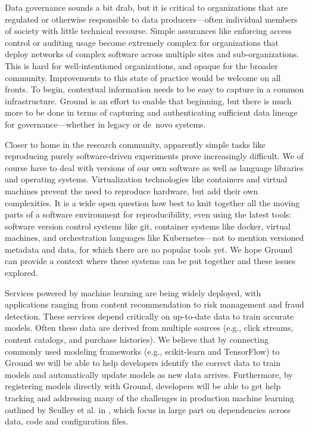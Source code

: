 \documentclass{cidr-2017}
\begin{document}
Data governance sounds a bit drab, but it is critical to organizations that are regulated or otherwise responsible to data producers---often individual members of society with little technical recourse. Simple assurances like enforcing access control or auditing usage become extremely complex for organizations that deploy networks of complex software across multiple sites and sub-organizations. This is hard for well-intentioned organizations, and opaque for the broader community. Improvements to this state of practice would be welcome on all fronts. To begin, contextual information needs to be easy to capture in a common infrastructure. Ground is an effort to enable that beginning, but there is much more to be done in terms of capturing and authenticating sufficient data lineage for governance---whether in legacy or de~novo systems.

Closer to home in the research community, apparently simple tasks like reproducing purely software-driven experiments prove increasingly difficult.  We of course have to deal with versions of our own software as well as language libraries and operating systems. Virtualization technologies like containers and virtual machines prevent the need to reproduce hardware, but add their own complexities. It is a wide open question how best to knit together all the moving parts of a software environment for reproducibility, even using the latest tools: software version control systems like git, container systems like docker, virtual machines, and orchestration languages like Kubernetes---not to mention versioned metadata and data, for which there are no popular tools yet. We hope Ground can provide a context where these systems can be put together and these issues explored.

Services powered by machine learning are being widely deployed, with applications ranging from content recommendation to risk management and fraud detection.
These services depend critically on up-to-date data to train accurate models.
Often these data are derived from multiple sources (e.g., click streams, content catalogs, and purchase histories).
We believe that by connecting commonly used modeling frameworks (e.g., scikit-learn and TensorFlow) to Ground we will be able to help developers identify the correct data to train models and automatically update models as new data arrives. 
Furthermore, by registering models directly with Ground, developers will be able to get help tracking and addressing many of the challenges in production machine learning outlined by Sculley et al. in \cite{sculley2}, which focus in large part on dependencies across data, code and configuration files.
\end{document}
